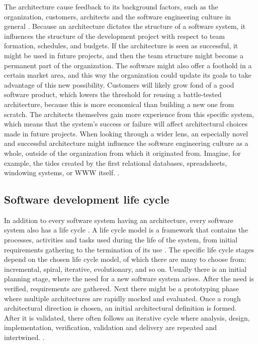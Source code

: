 \documentclass[utf8,english]{gradu3}
\begin{document}
The architecture cause feedback to its background factors, such as the
organization, customers, architects and the software engineering culture in
general \parencite{Bass1998}. Because an architecture dictates the structure of
a software system, it influences the structure of the development project with
respect to team formation, schedules, and budgets. If the architecture is seen as
successful, it might be used in future projects, and then the team structure
might become a permanent part of the organization. The software might also offer
a foothold in a certain market area, and this way the organization could update
its goals to take advantage of this new possibility. Customers will likely grow
fond of a good software product, which lowers the threshold for reusing a
battle-tested architecture, because this is more economical than building a new
one from scratch. The architects themselves gain more experience from this
specific system, which means that the system's success or failure will affect
architectural choices made in future projects. When looking through a wider
lens, an especially novel and successful architecture might influence the
software engineering culture as a whole, outside of the organization from which
it originated from. Imagine, for example, the tides created by the first relational
databases, spreadsheets, windowing systems, or WWW itself.
\parencite[10-11]{Bass1998}.


\subsection{Software development life cycle}

In addition to every software system having an architecture, every software
system also has a life cycle \parencite[17]{IEEE12207}. A life
  cycle model is a framework that contains the processes, activities and tasks
used during the life of the system, from initial requirements gathering to the
termination of its use \parencite[3]{IEEE42010}. The specific life cycle stages
depend on the chosen life cycle model, of which there are many to choose from:
incremental, spiral, iterative, evolutionary, and so on. Usually there is an
initial planning stage, where the need for a new software system arises. After
the need is verified, requirements are gathered. Next there might be a
prototyping phase where multiple architectures are rapidly mocked and evaluated.
Once a rough architectural direction is chosen, an initial architectural
definition is formed. After it is validated, there often follows an iterative
cycle where analysis, design, implementation, verification, validation and
delivery are repeated and intertwined. \parencite[18]{IEEE12207}.
\end{document}
